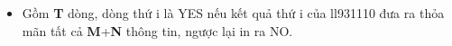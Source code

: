 \begin{itemize}
	\item Gồm \textbf{T} dòng, dòng thứ i là YES nếu kết quả thứ i của ll931110 đưa ra thỏa mãn tất cả \textbf{M}+\textbf{N} thông tin, ngược lại in ra NO.
\end{itemize}
